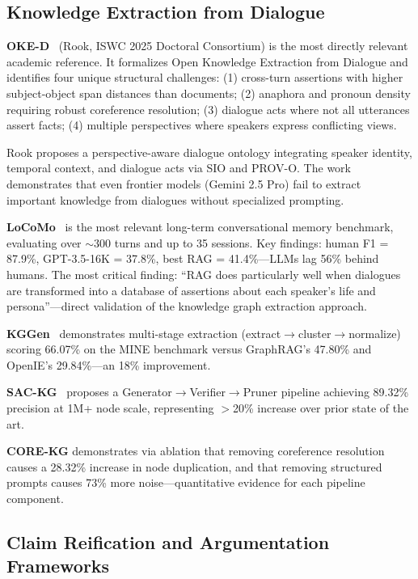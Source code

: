 \subsection{Knowledge Extraction from Dialogue}

\textbf{OKE-D}~\cite{rook2025oked} (Rook, ISWC 2025 Doctoral Consortium) is the most directly relevant academic reference. It formalizes Open Knowledge Extraction from Dialogue and identifies four unique structural challenges: (1) cross-turn assertions with higher subject-object span distances than documents; (2) anaphora and pronoun density requiring robust coreference resolution; (3) dialogue acts where not all utterances assert facts; (4) multiple perspectives where speakers express conflicting views.

Rook proposes a perspective-aware dialogue ontology integrating speaker identity, temporal context, and dialogue acts via SIO and PROV-O. The work demonstrates that even frontier models (Gemini 2.5 Pro) fail to extract important knowledge from dialogues without specialized prompting.

\textbf{LoCoMo}~\cite{maharana2024locomo} is the most relevant long-term conversational memory benchmark, evaluating over $\sim$300 turns and up to 35 sessions. Key findings: human F1 = 87.9\%, GPT-3.5-16K = 37.8\%, best RAG = 41.4\%---LLMs lag 56\% behind humans. The most critical finding: ``RAG does particularly well when dialogues are transformed into a database of assertions about each speaker's life and persona''---direct validation of the knowledge graph extraction approach.

\textbf{KGGen}~\cite{mo2025kggen} demonstrates multi-stage extraction (extract$\rightarrow$cluster$\rightarrow$normalize) scoring 66.07\% on the MINE benchmark versus GraphRAG's 47.80\% and OpenIE's 29.84\%---an 18\% improvement.

\textbf{SAC-KG}~\cite{chen2024sackg} proposes a Generator$\rightarrow$Verifier$\rightarrow$Pruner pipeline achieving 89.32\% precision at 1M+ node scale, representing $>$20\% increase over prior state of the art.

\textbf{CORE-KG} demonstrates via ablation that removing coreference resolution causes a 28.32\% increase in node duplication, and that removing structured prompts causes 73\% more noise---quantitative evidence for each pipeline component.

\subsection{Claim Reification and Argumentation Frameworks}

